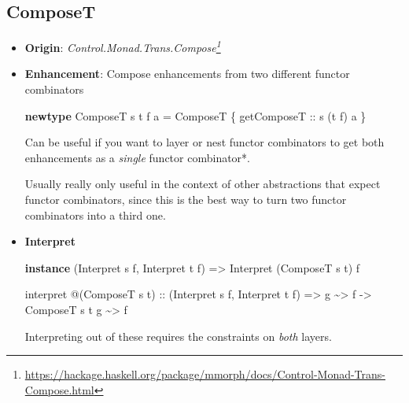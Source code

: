 \documentclass[]{article}
\newenvironment{Shaded}{}{}
\newcommand{\DataTypeTok}[1]{\textcolor[rgb]{0.56,0.13,0.00}{#1}}
\newcommand{\KeywordTok}[1]{\textcolor[rgb]{0.00,0.44,0.13}{\textbf{#1}}}
\newcommand{\NormalTok}[1]{#1}
\newcommand{\OperatorTok}[1]{\textcolor[rgb]{0.40,0.40,0.40}{#1}}
\newcommand{\OtherTok}[1]{\textcolor[rgb]{0.00,0.44,0.13}{#1}}
\renewcommand{\href}[2]{#2\footnote{\url{#1}}}
\begin{document}
\subsection{ComposeT}\label{composet}

\begin{itemize}
\item
  \textbf{Origin}:
  \emph{\href{https://hackage.haskell.org/package/mmorph/docs/Control-Monad-Trans-Compose.html}{Control.Monad.Trans.Compose}}
\item
  \textbf{Enhancement}: Compose enhancements from two different functor
  combinators

\begin{Shaded}
\begin{Highlighting}[]
\KeywordTok{newtype} \DataTypeTok{ComposeT}\NormalTok{ s t f a }\OtherTok{=} \DataTypeTok{ComposeT}\NormalTok{ \{}\OtherTok{ getComposeT ::}\NormalTok{ s (t f) a \}}
\end{Highlighting}
\end{Shaded}

  Can be useful if you want to layer or nest functor combinators to get both
  enhancements as a \emph{single} functor combinator*.

  Usually really only useful in the context of other abstractions that expect
  functor combinators, since this is the best way to turn two functor
  combinators into a third one.
\item
  \textbf{Interpret}

\begin{Shaded}
\begin{Highlighting}[]
\KeywordTok{instance}\NormalTok{ (}\DataTypeTok{Interpret}\NormalTok{ s f, }\DataTypeTok{Interpret}\NormalTok{ t f) }\OtherTok{=\textgreater{}} \DataTypeTok{Interpret}\NormalTok{ (}\DataTypeTok{ComposeT}\NormalTok{ s t) f}

\NormalTok{interpret }\OperatorTok{@}\NormalTok{(}\DataTypeTok{ComposeT}\NormalTok{ s t)}
\OtherTok{    ::}\NormalTok{ (}\DataTypeTok{Interpret}\NormalTok{ s f, }\DataTypeTok{Interpret}\NormalTok{ t f)}
    \OtherTok{=\textgreater{}}\NormalTok{ g }\OperatorTok{\textasciitilde{}\textgreater{}}\NormalTok{ f}
    \OtherTok{{-}\textgreater{}} \DataTypeTok{ComposeT}\NormalTok{ s t g }\OperatorTok{\textasciitilde{}\textgreater{}}\NormalTok{ f}
\end{Highlighting}
\end{Shaded}

  Interpreting out of these requires the constraints on \emph{both} layers.
\end{itemize}
\end{document}
